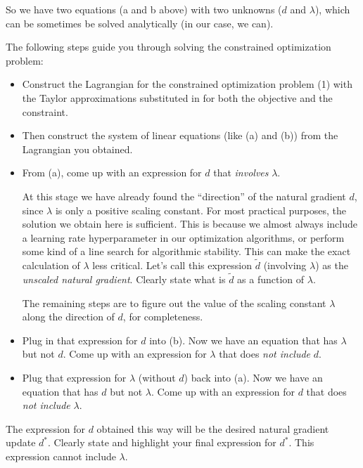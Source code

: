 So we have two equations (a and b above) with two unknowns ($d$ and $\lambda$), which can be sometimes be solved analytically (in our case, we can).

The following steps guide you through solving the constrained optimization problem:

\begin{itemize}
\item Construct the Lagrangian for the constrained optimization problem (1) with the Taylor approximations substituted in for both the objective and the constraint.

\item Then construct the system of linear equations (like (a) and (b)) from the Lagrangian you obtained.

\item From (a), come up with an expression for $d$ that \emph{involves} $\lambda$.

At this stage we have already found the ``direction'' of the natural gradient $d$, since $\lambda$ is only a positive scaling constant. For most practical purposes, the solution we obtain here is sufficient. This is because we almost always include a learning rate hyperparameter in our optimization algorithms, or perform some kind of a line search for algorithmic stability. This can make the exact calculation of $\lambda$ less critical. Let's call this expression $\tilde{d}$ (involving $\lambda$) as the \emph{unscaled natural gradient}. Clearly state what is $\tilde{d}$ as a function of $\lambda$.

The remaining steps are to figure out the value of the scaling constant $\lambda$ along the direction of $d$, for completeness.

\item Plug in that expression for $d$ into (b). Now we have an equation that has $\lambda$ but not $d$. Come up with an expression for $\lambda$ that does \emph{not include} $d$.

\item Plug that expression for $\lambda$ (without $d$) back into (a). Now we have an equation that has $d$ but not $\lambda$. Come up with an expression for $d$ that does \emph{not include} $\lambda$.
\end{itemize}

The expression for $d$ obtained this way will be the desired natural gradient update $d^*$. Clearly state and highlight your final expression for $d^*$. This expression cannot include $\lambda$.

